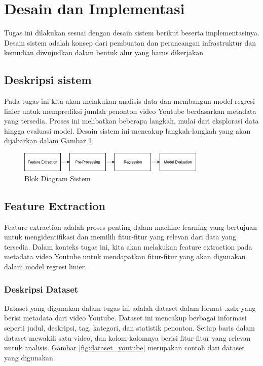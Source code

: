 \newpage

\section{Desain dan Implementasi}

Tugas ini dilakukan sesuai dengan desain sistem berikut beserta implementasinya. Desain sistem adalah konsep dari pembuatan dan perancangan infrastruktur dan kemudian diwujudkan dalam bentuk alur yang harus dikerjakan


\subsection{Deskripsi sistem}
Pada tugas ini kita akan melakukan analisis data dan membangun model regresi linier untuk memprediksi jumlah penonton video Youtube berdasarkan metadata yang tersedia. Proses ini melibatkan beberapa langkah, mulai dari eksplorasi data hingga evaluasi model. Desain sistem ini mencakup langkah-langkah yang akan dijabarkan dalam Gambar \ref{fig:desain_sistem}.

\begin{figure}[ht]
    \centering
    \includegraphics[width=0.8\textwidth]{gambar/metodologi.png}
    \caption{Blok Diagram Sistem}
    \label{fig:desain_sistem}
\end{figure}

\subsection{Feature Extraction}
Feature extraction adalah proses penting dalam machine learning yang bertujuan untuk mengidentifikasi dan memilih fitur-fitur yang relevan dari data yang tersedia. Dalam konteks tugas ini, kita akan melakukan feature extraction pada metadata video Youtube untuk mendapatkan fitur-fitur yang akan digunakan dalam model regresi linier.

\subsubsection{Deskripsi Dataset}
Dataset yang digunakan dalam tugas ini adalah dataset dalam format .xslx yang berisi metadata dari video Youtube. Dataset ini mencakup berbagai informasi seperti judul, deskripsi, tag, kategori, dan statistik penonton. Setiap baris dalam dataset mewakili satu video, dan kolom-kolomnya berisi fitur-fitur yang relevan untuk analisis. Gambar \ref{fig:dataset_youtube} merupakan contoh dari dataset yang digunakan.

